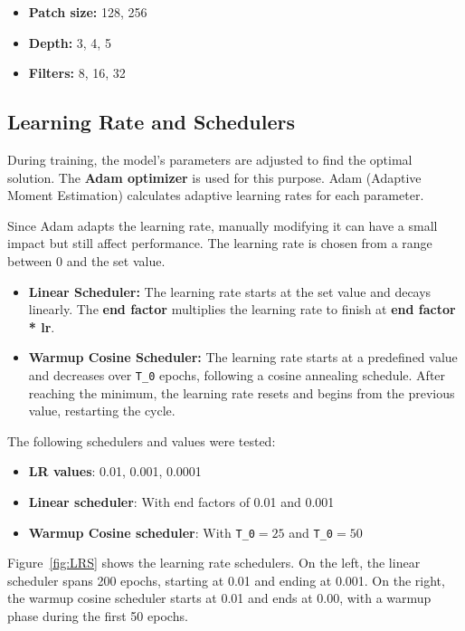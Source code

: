 \begin{itemize}
    \item \textbf{Patch size:} 128, 256
    \item \textbf{Depth:} 3, 4, 5
    \item \textbf{Filters:} 8, 16, 32
\end{itemize}

\subsection{Learning Rate and Schedulers}\label{sec:1.2.9}

During training, the model's parameters are adjusted to find the optimal solution. The \textbf{Adam optimizer} \cite{kingma2017adammethodstochasticoptimization} is used for this purpose. Adam (Adaptive Moment Estimation) calculates adaptive learning rates for each parameter.

Since Adam adapts the learning rate, manually modifying it can have a small impact but still affect performance. The learning rate is chosen from a range between 0 and the set value.

\begin{itemize}
    \item \textbf{Linear Scheduler:} The learning rate starts at the set value and decays linearly. The \textbf{end factor} multiplies the learning rate to finish at \textbf{end factor * lr}.
    \item \textbf{Warmup Cosine Scheduler:} The learning rate starts at a predefined value and decreases over \texttt{T\_0} epochs, following a cosine annealing schedule. After reaching the minimum, the learning rate resets and begins from the previous value, restarting the cycle.
\end{itemize}

The following schedulers and values were tested:
\begin{itemize}
    \item \textbf{LR values}: 0.01, 0.001, 0.0001
    \item \textbf{Linear scheduler}: With end factors of 0.01 and 0.001
    \item \textbf{Warmup Cosine scheduler}: With \texttt{T\_0}$= 25$ and \texttt{T\_0}$= 50$
\end{itemize}

Figure~\ref{fig:LRS} shows the learning rate schedulers. On the left, the linear scheduler spans 200 epochs, starting at 0.01 and ending at 0.001. On the right, the warmup cosine scheduler starts at 0.01 and ends at 0.00, with a warmup phase during the first 50 epochs.


